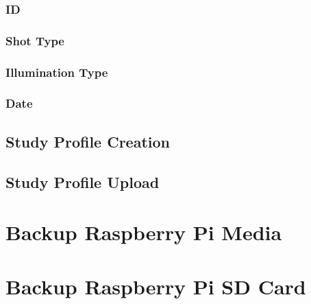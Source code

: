 \documentclass[12pt]{article}
\begin{document}
\begin{center}
	\subsubsection{ID}
	\subsubsection{Shot Type}
	\subsubsection{Illumination Type}
	\subsubsection{Date}
	\subsection{Study Profile Creation}
	\subsection{Study Profile Upload}
	\section{Backup Raspberry Pi Media}
	\section{Backup Raspberry Pi SD Card}
\end{center}
\end{document}
